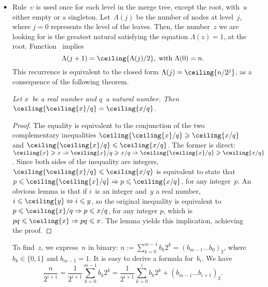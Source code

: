 \begin{itemize}
  \item Rule~\(\upsilon\) is used once for each level in the merge
    tree, except the root, with~\(u\) either
    empty or a singleton.  Let~\(\Lambda(j)\) be the number of nodes
    at level~\(j\), where \(j=0\) represents the level of the
    leaves. Then, the number~\(z\) we are looking for is the greatest
    natural satisfying the equation \(\Lambda(z) = 1\), at the
    root. Function~ implies
    \begin{equation*}
      \Lambda(j+1) = \ceiling{\Lambda(j)/2},\; \text{with \(\Lambda(0)
        = n\)}.
    \end{equation*}
    This recurrence is equivalent to the closed form \(\Lambda(j) =
    \ceiling{n/2^j}\), as a consequence of the following theorem.
\begin{thm}
\label{thm:ceilings}
\textsl{Let \(x\)~be a real number and \(q\)~a natural number. Then
  \(\ceiling{\ceiling{x}/q} = \ceiling{x/q}\).}
\end{thm}
\begin{proof}
  The equality is equivalent to the conjunction of the two
  complementary inequalities \(\ceiling{\ceiling{x}/q} \geqslant
  \ceiling{x/q}\) and \(\ceiling{\ceiling{x}/q} \leqslant
  \ceiling{x/q}\). The former is direct: \(\ceiling{x} \geqslant x
  \Rightarrow \ceiling{x}/q \geqslant x/q \Rightarrow
  \ceiling{\ceiling{x}/q} \geqslant \ceiling{x/q}\). Since both sides
  of the inequality are integers, \(\ceiling{\ceiling{x}/q} \leqslant
  \ceiling{x/q}\) is equivalent to state that \(p \leqslant
  \ceiling{\ceiling{x}/q} \Rightarrow p \leqslant \ceiling{x/q}\), for
  any integer~\(p\). An obvious lemma is that if \(i\)~is an integer
  and~\(y\) a real number, \(i \leqslant \ceiling{y} \Leftrightarrow i
  \leqslant y\), so the original inequality is equivalent to \(p
  \leqslant \ceiling{x}/q \Rightarrow p \leqslant x/q\), for any
  integer \(p\), which is \(pq \leqslant \ceiling{x} \Rightarrow pq
  \leqslant x\). The lemma yields this implication, achieving the
  proof.
\end{proof}
    \noindent To find~\(z\), we express~\(n\) in binary:
    \(n :=\!  \sum_{k=0}^{m-1}{b_k2^k} = (b_{m-1}\ldots
    b_0)_2\), where \(b_k \in \{0,1\}\) and \(b_{m-1} = 1\). It is
    easy to derive a formula for~\(b_i\). We have
    \begin{equation}
      \frac{n}{2^{i+1}}
      = \frac{1}{2^{i+1}}\sum_{k=0}^{m-1}{b_k2^{k}}
      = \frac{1}{2^{i+1}}\sum_{k=0}^{i}{b_k2^k} + (b_{m-1}\dots b_{i+1})_2.

\end{equation}
\end{itemize}
